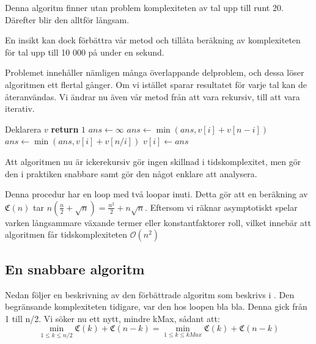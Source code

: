 \documentclass[a4paper,titlepage]{article}
\newcommand{\C}[1]{\mathfrak C \left( #1 \right)}
\renewcommand{\O}{\mathcal {O}}
\theoremstyle{definition}
\begin{document}
    Denna algoritm finner utan problem komplexiteten av tal upp till runt 20.
    Därefter blir den alltför långsam.

    En insikt kan dock förbättra vår metod och tillåta beräkning av komplexiteten
    för tal upp till 10 000 på under en sekund.

    Problemet innehåller nämligen många överlappande delproblem, och dessa löser
    algoritmen ett flertal gånger. Om vi istället sparar resultatet för varje tal
    kan de återanvändas. Vi ändrar nu även vår metod från att vara rekursiv, till
    att vara iterativ.


    \begin{algorithm}[H]
        \caption{$\O(N^2)$}
        \begin{algorithmic}[1]
                \State Deklarera $v$
                    \State \textbf{return} $1$
                    \State  $ans\gets \infty$
                        \State $ans\gets \min(ans, v[i]+ v[n-i])$
                    \EndFor
                            \State $ans\gets \min(ans, v[i]+v[n/i])$
                        \EndIf
                    \EndFor
                    \State $v[i] \gets ans$
                \EndFor
            \EndProcedure
        \end{algorithmic}
    \end{algorithm}


    Att algoritmen nu är ickerekursiv gör ingen skillnad i tidskomplexitet, men gör
    den i praktiken snabbare samt gör den något enklare att analysera.

    Denna procedur har en loop med två loopar inuti. Detta gör att en beräkning av
    $\C{n}$ tar $n\left(\frac{n}{2}+\sqrt n\right) = \frac{n^2}{2} + n\sqrt n$.
    Eftersom vi räknar asymptotiskt spelar varken långsammare växande termer eller
    konstantfaktorer roll,  vilket innebär att algoritmen får tidskomplexiteten
    $\O(n^2)$

    \subsection{En snabbare algoritm}
    Nedan följer en beskrivning av den förbättrade algoritm som beskrivs i \cite{algorithm_lune}.
    Den begränsande komplexiteten tidigare, var den hos loopen bla bla. Denna gick från 1 till n/2. Vi söker nu ett nytt, mindre kMax, sådant att:
    $$\min\limits_{1 \leq k \leq n/2} \C{k} + \C{n-k} = \min\limits_{1 \leq k \leq kMax} \C{k} + \C{n-k}$$
\end{document}
